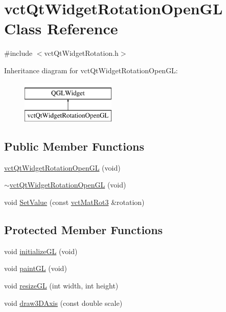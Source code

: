 \hypertarget{classvct_qt_widget_rotation_open_g_l}{\section{vct\-Qt\-Widget\-Rotation\-Open\-G\-L Class Reference}
\label{classvct_qt_widget_rotation_open_g_l}
}


{\ttfamily \#include $<$vct\-Qt\-Widget\-Rotation.\-h$>$}

Inheritance diagram for vct\-Qt\-Widget\-Rotation\-Open\-G\-L\-:\begin{figure}[H]
\begin{center}
\leavevmode
\includegraphics[height=2.000000cm]{db/d62/classvct_qt_widget_rotation_open_g_l}
\end{center}
\end{figure}
\subsection*{Public Member Functions}
\begin{DoxyCompactItemize}
\item 
\hyperlink{classvct_qt_widget_rotation_open_g_l_a85770983769f339d9413469cc675459a}{vct\-Qt\-Widget\-Rotation\-Open\-G\-L} (void)
\item 
\hyperlink{classvct_qt_widget_rotation_open_g_l_a8d0b0ed089215ff0a7a151e9c64c22b8}{$\sim$vct\-Qt\-Widget\-Rotation\-Open\-G\-L} (void)
\item 
void \hyperlink{classvct_qt_widget_rotation_open_g_l_a298f09ac2e58f8dbab585ff7043fc39a}{Set\-Value} (const \hyperlink{vct_transformation_types_8h_a30fe23c1d38748a9b8f2fb9bb2471382}{vct\-Mat\-Rot3} \&rotation)
\end{DoxyCompactItemize}
\subsection*{Protected Member Functions}
\begin{DoxyCompactItemize}
\item 
void \hyperlink{classvct_qt_widget_rotation_open_g_l_ae0d4b905ea88519fed5cb4e01a92ff52}{initialize\-G\-L} (void)
\item 
void \hyperlink{classvct_qt_widget_rotation_open_g_l_abd1e68e6770fbbdb57bbe6645b4713da}{paint\-G\-L} (void)
\item 
void \hyperlink{classvct_qt_widget_rotation_open_g_l_a41ac2ac38ff2cc2f789e9681e1327aeb}{resize\-G\-L} (int width, int height)
\item 
void \hyperlink{classvct_qt_widget_rotation_open_g_l_a4bc2dceaacfa29f43cbd134eea70b977}{draw3\-D\-Axis} (const double scale)
\end{DoxyCompactItemize}
